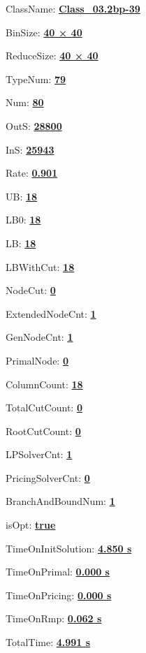 \documentclass[11pt]{article}
\begin{document}
\pagestyle{empty}


ClassName: \underline{\textbf{Class_03.2bp-39}}
\par
BinSize: \underline{\textbf{40 × 40}}
\par
ReduceSize: \underline{\textbf{40 × 40}}
\par
TypeNum: \underline{\textbf{79}}
\par
Num: \underline{\textbf{80}}
\par
OutS: \underline{\textbf{28800}}
\par
InS: \underline{\textbf{25943}}
\par
Rate: \underline{\textbf{0.901}}
\par
UB: \underline{\textbf{18}}
\par
LB0: \underline{\textbf{18}}
\par
LB: \underline{\textbf{18}}
\par
LBWithCut: \underline{\textbf{18}}
\par
NodeCut: \underline{\textbf{0}}
\par
ExtendedNodeCnt: \underline{\textbf{1}}
\par
GenNodeCnt: \underline{\textbf{1}}
\par
PrimalNode: \underline{\textbf{0}}
\par
ColumnCount: \underline{\textbf{18}}
\par
TotalCutCount: \underline{\textbf{0}}
\par
RootCutCount: \underline{\textbf{0}}
\par
LPSolverCnt: \underline{\textbf{1}}
\par
PricingSolverCnt: \underline{\textbf{0}}
\par
BranchAndBoundNum: \underline{\textbf{1}}
\par
isOpt: \underline{\textbf{true}}
\par
TimeOnInitSolution: \underline{\textbf{4.850 s}}
\par
TimeOnPrimal: \underline{\textbf{0.000 s}}
\par
TimeOnPricing: \underline{\textbf{0.000 s}}
\par
TimeOnRmp: \underline{\textbf{0.062 s}}
\par
TotalTime: \underline{\textbf{4.991 s}}
\par
\newpage


\end{document}
